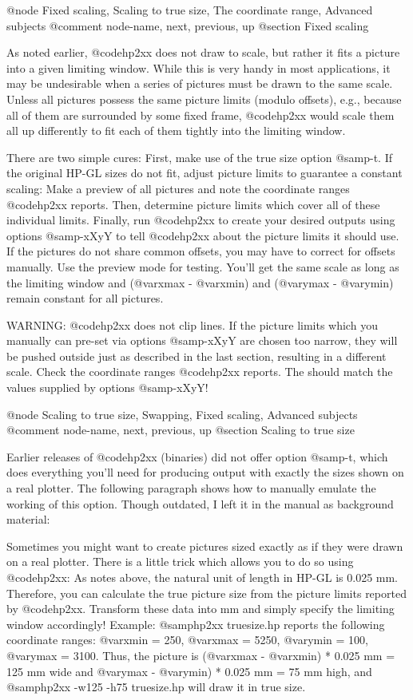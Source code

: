 @node Fixed scaling, Scaling to true size, The coordinate range, Advanced subjects
@comment  node-name,  next,  previous,  up
@section Fixed scaling

As noted earlier, @code{hp2xx} does not draw to scale, but rather it fits
a picture into a given limiting window. While this is very handy in most
applications, it may be undesirable when a series of pictures must be drawn
to the same scale. Unless all pictures possess the same picture limits
(modulo offsets), e.g., because all of them are surrounded by some fixed
frame, @code{hp2xx} would scale them all up differently to fit each of them
tightly into the limiting window.

There are two simple cures: First, make use of the true size option @samp{-t}.
If the original HP-GL sizes do not fit, adjust picture limits to
guarantee a constant scaling: Make a preview of all pictures and note
the coordinate ranges @code{hp2xx} reports. Then, determine picture limits
which cover all of these individual limits. Finally, run @code{hp2xx}
to create your desired outputs using options @samp{-xXyY} to tell
@code{hp2xx} about the picture limits it should use. If the pictures
do not share common offsets, you may have to correct for offsets
manually. Use the preview mode for testing. You'll get the same scale
as long as the limiting window and (@var{xmax} - @var{xmin}) and
(@var{ymax} - @var{ymin}) remain constant for all pictures.

WARNING: @code{hp2xx} does not clip lines. If the picture limits which
you manually can pre-set via options @samp{-xXyY} are chosen too narrow,
they will be pushed outside just as described in the last section,
resulting in a different scale. Check the coordinate ranges @code{hp2xx}
reports. The should match the values supplied by options @samp{-xXyY}!




@node Scaling to true size, Swapping, Fixed scaling, Advanced subjects
@comment  node-name,  next,  previous,  up
@section Scaling to true size

Earlier releases of @code{hp2xx} (binaries) did not offer option
@samp{-t}, which does everything you'll need for producing output with
exactly the sizes shown on a real plotter. The following paragraph
shows how to manually emulate the working of this option. Though outdated,
I left it in the manual as background material:

Sometimes you might want to create pictures sized exactly as if they
were drawn on a real plotter. There is a little trick which allows
you to do so using @code{hp2xx}: As notes above, the natural unit of
length in HP-GL is 0.025 mm. Therefore, you can calculate the true
picture size from the picture limits reported by @code{hp2xx}. Transform
these data into mm and simply specify the limiting window accordingly!
Example:
@samp{hp2xx truesize.hp} reports the following coordinate ranges:
@var{xmin} = 250, @var{xmax} = 5250, @var{ymin} = 100, @var{ymax} = 3100.
Thus, the picture is (@var{xmax} - @var{xmin}) * 0.025 mm = 125 mm wide
and @var{ymax} - @var{ymin}) * 0.025 mm = 75 mm high, and
@samp{hp2xx -w125 -h75 truesize.hp} will draw it in true size.




